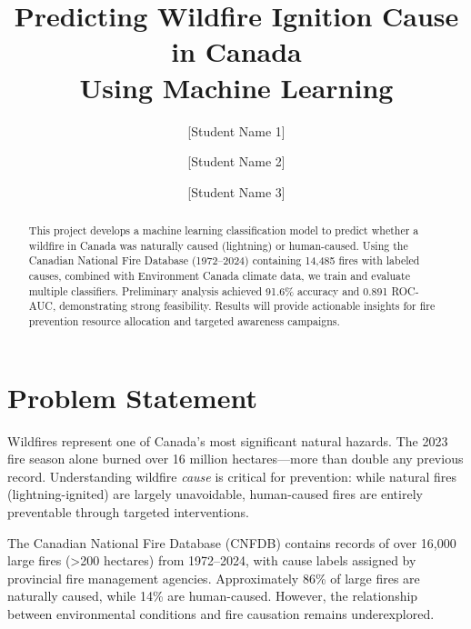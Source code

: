 \documentclass[sigconf,nonacm]{acmart}
\begin{document}
\title{Predicting Wildfire Ignition Cause in Canada\\Using Machine Learning}

\author{[Student Name 1]}

\author{[Student Name 2]}

\author{[Student Name 3]}

\begin{abstract}
This project develops a machine learning classification model to predict whether a wildfire in Canada was naturally caused (lightning) or human-caused. Using the Canadian National Fire Database (1972--2024) containing 14,485 fires with labeled causes, combined with Environment Canada climate data, we train and evaluate multiple classifiers. Preliminary analysis achieved 91.6\% accuracy and 0.891 ROC-AUC, demonstrating strong feasibility. Results will provide actionable insights for fire prevention resource allocation and targeted awareness campaigns.
\end{abstract}

\maketitle

\section{Problem Statement}

Wildfires represent one of Canada's most significant natural hazards. The 2023 fire season alone burned over 16 million hectares---more than double any previous record. Understanding wildfire \textit{cause} is critical for prevention: while natural fires (lightning-ignited) are largely unavoidable, human-caused fires are entirely preventable through targeted interventions.

The Canadian National Fire Database (CNFDB) contains records of over 16,000 large fires (>200 hectares) from 1972--2024, with cause labels assigned by provincial fire management agencies. Approximately 86\% of large fires are naturally caused, while 14\% are human-caused. However, the relationship between environmental conditions and fire causation remains underexplored.
\end{document}
